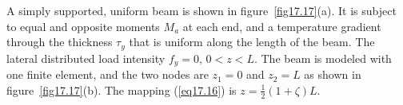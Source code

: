\documentclass{AeroStructure-ERJohnson}
\begin{document}
\pagebreak

\begin{example} \label{ex17.3}
A simply supported, uniform beam is shown in figure~\ref{fig17.17}(a). It is subject to equal and opposite moments $M_{a}$ at each end, and a temperature gradient through the thickness $\tau_{y}$ that is uniform along the length of the beam. The lateral distributed load intensity $f_{y}=0$, $0<z<L$. The beam is modeled with one finite element, and the two nodes are $z_{1}=0$ and $z_{2}=L$ as shown in figure~\ref{fig17.17}(b). The mapping (\ref{eq17.16}) is $z=\frac{1}{2}(1+\zeta) L$.

{\def\thefigure{17.17}
}



\end{example}
\end{document}
